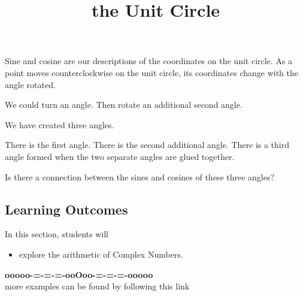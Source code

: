 \documentclass{ximera}
\title{the Unit Circle}
\begin{document}
\begin{abstract}
\end{abstract}
\maketitle




Sine and cosine are our descriptions of the coordinates on the unit circle. As a point moves counterclockwise on the unit circle, its coordinates change with the angle rotated.


We could turn an angle. Then rotate an additional second angle.

We have created three angles.

There is the first angle. There is the second additional angle. There is a third angle formed when the two separate angles are glued together.

Is there a connection between the sines and cosines of these three angles?





\subsection*{Learning Outcomes}

\begin{sectionOutcomes}
In this section, students will 

\begin{itemize}
\item explore the arithmetic of Complex Numbers.
\end{itemize}
\end{sectionOutcomes}



















\begin{onlineOnly}
\begin{center}
\textbf{\textcolor{green!50!black}{ooooo-=-=-=-ooOoo-=-=-=-ooooo}} \\

more examples can be found by following this link\\ 

\end{center}
\end{onlineOnly}
\end{document}
